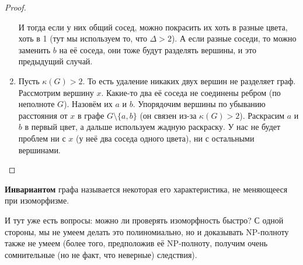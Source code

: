 \documentclass{article}
\begin{document}
\begin{proof}
\begin{enumerate}
\begin{figure}[H]
            \end{figure}\noindent
            И тогда если у них общий сосед, можно покрасить их хоть в разные цвета, хоть в 1 (тут мы используем то, что $\Delta>2$). А если разные соседи, то можно заменить $b$ на её соседа, они тоже будут разделять вершины, и это предыдущий случай.
            \item Пусть $\kappa(G)>2$. То есть удаление никаких двух вершин не разделяет граф. Рассмотрим вершину $x$. Какие-то два её соседа не соединены ребром (по неполноте $G$). Назовём их $a$ и $b$. Упорядочим вершины по убыванию расстояния от $x$ в графе $G\setminus\{a,b\}$ (он связен из-за $\kappa(G)>2$). Раскрасим $a$ и $b$ в первый цвет, а дальше используем жадную раскраску. У нас не будет проблем ни с $x$ (у неё два соседа одного цвета), ни с остальными вершинами.
        \end{enumerate}
    \end{proof}
    \begin{definition}
        \textbf{Инвариантом} графа называется некоторая его характеристика, не меняющееся при изоморфизме.
    \end{definition}
    \begin{remark}
        И тут уже есть вопросы: можно ли проверять изоморфность быстро? С одной стороны, мы не умеем делать это полиномиально, но и доказывать NP-полноту также не умеем (более того, предположив её NP-полноту, получим очень сомнительные (но не факт, что неверные) следствия).
    \end{remark}
\end{document}
